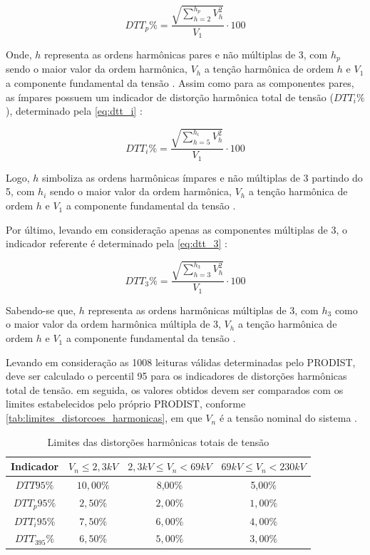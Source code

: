 \begin{equation}
  DTT_p\% = \frac{\sqrt{\sum_{h=2}^{h_{p}}V_h^2}}{V_1}\cdot 100
  \label{eq:dtt_p}
\end{equation}

Onde, $h$ representa as ordens harmônicas pares e não múltiplas de 3, com $h_p$ sendo o maior valor da ordem harmônica, $V_h$ a tenção harmônica de ordem $h$ e $V_1$ a componente fundamental da tensão \cite{ref:ANEEL2021}.
Assim como para as componentes pares, as ímpares possuem um indicador de distorção harmônica total de tensão ($DTT_i\%$), determinado pela \autoref{eq:dtt_i} \cite{ref:ANEEL2021}:

\begin{equation}
  DTT_i\% = \frac{\sqrt{\sum_{h=5}^{h_{i}}V_h^2}}{V_1}\cdot 100
  \label{eq:dtt_i}
\end{equation}

Logo, $h$ simboliza as ordens harmônicas ímpares e não múltiplas de 3 partindo do 5, com $h_i$ sendo o maior valor da ordem harmônica, $V_h$ a tenção harmônica de ordem $h$ e $V_1$ a componente fundamental da tensão \cite{ref:ANEEL2021}.

Por último, levando em consideração apenas as componentes múltiplas de 3, o indicador referente é determinado pela \autoref{eq:dtt_3} \cite{ref:ANEEL2021}:

\begin{equation}
  DTT_3\% = \frac{\sqrt{\sum_{h=3}^{h_{3}}V_h^2}}{V_1}\cdot 100
  \label{eq:dtt_3}
\end{equation}

Sabendo-se que, $h$ representa as ordens harmônicas múltiplas de 3, com $h_3$ como o maior valor da ordem harmônica múltipla de 3, $V_h$ a tenção harmônica de ordem $h$ e $V_1$ a componente fundamental da tensão \cite{ref:ANEEL2021}.

Levando em consideração as 1008 leituras válidas determinadas pelo PRODIST, deve ser calculado o percentil 95 para os indicadores de distorções harmônicas total de tensão. em seguida, os valores obtidos devem ser comparados com os limites estabelecidos pelo próprio PRODIST, conforme \autoref{tab:limites_distorcoes_harmonicas}, em que $V_n$ é a tensão nominal do sistema \cite{ref:ANEEL2021}.

\begin{table}[H]
  \centering
  \caption{Limites das distorções harmônicas totais de tensão}
  \label{tab:limites_distorcoes_harmonicas}
  \begin{tabular}{@{}cccc@{}}
  \toprule
  \textbf{Indicador} & \textbf{$V_n\leq 2,3 kV$} & \textbf{$2,3 kV\leq V_n<69 kV$} & \textbf{$69 kV\leq V_n<230 kV$} \\ \midrule
  $DTT95\%$ & $10,00\%$ & 8,00\% & 5,00\% \\
  $DTT_p95\%$ & $2,50\%$ & $2,00\%$ & $1,00\%$ \\
  $DTT_i95\%$ & $7,50\%$ & $6,00\%$ & $4,00\%$ \\
  $DTT_395\%$ & $6,50\%$ & $5,00\%$ & $3,00\%$ \\ \bottomrule
  \end{tabular}
\end{table}

